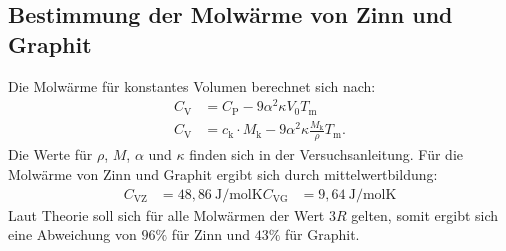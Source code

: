 \subsection{Bestimmung der Molwärme von Zinn und Graphit}
Die Molwärme für konstantes Volumen berechnet sich nach:
\begin{align}
  C_\mathrm{V} & =C_\mathrm{P}-9\alpha^2\kappa V_\mathrm{0}T_\mathrm{m}\\
  C_\mathrm{V} & =c_\mathrm{k}\cdot M_\mathrm{k}-9\alpha^2\kappa \frac{M_\mathrm{k}}{\rho}T_\mathrm{m}.
\end{align}
Die Werte für $\rho$, $M$, $\alpha$ und $\kappa$ finden sich in der Versuchsanleitung.
Für die Molwärme von Zinn und Graphit ergibt sich durch mittelwertbildung:
\begin{align*}
  C_\mathrm{VZ}&=48,86 \ \si{\joule\per\mol\kelvin}
  C_\mathrm{VG}&=9,64  \ \si{\joule\per\mol\kelvin}
\end{align*}
Laut Theorie soll sich für alle Molwärmen der Wert $3R$ gelten, somit ergibt sich eine Abweichung von $96\si{\percent}$ für Zinn und $43\si{\percent}$ für Graphit.
